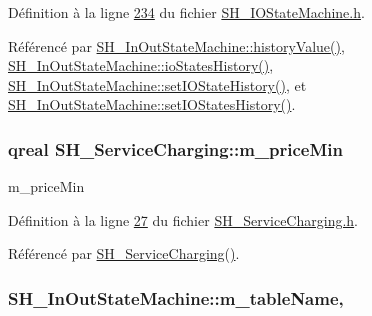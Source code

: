 Définition à la ligne \hyperlink{SH__IOStateMachine_8h_source_l00234}{234} du fichier \hyperlink{SH__IOStateMachine_8h_source}{S\-H\-\_\-\-I\-O\-State\-Machine.\-h}.



Référencé par \hyperlink{classSH__InOutStateMachine_af71bfdb3b59b7bf2763588b513b4205f}{S\-H\-\_\-\-In\-Out\-State\-Machine\-::history\-Value()}, \hyperlink{classSH__InOutStateMachine_a13889998c6dcd17db984dd6ed1454e80}{S\-H\-\_\-\-In\-Out\-State\-Machine\-::io\-States\-History()}, \hyperlink{classSH__InOutStateMachine_acbcce2c4300af1634d928b30e5e9be1c}{S\-H\-\_\-\-In\-Out\-State\-Machine\-::set\-I\-O\-State\-History()}, et \hyperlink{classSH__InOutStateMachine_af51f92c37d00a4eec4da42113cfd7d73}{S\-H\-\_\-\-In\-Out\-State\-Machine\-::set\-I\-O\-States\-History()}.

\hypertarget{classSH__ServiceCharging_a44584a7ff1edd6ae03c4f77544136c13}{
\subsubsection[{m\-\_\-price\-Min}]{\setlength{\rightskip}{0pt plus 5cm}qreal S\-H\-\_\-\-Service\-Charging\-::m\-\_\-price\-Min\hspace{0.3cm}{\ttfamily [private]}}}\label{classSH__ServiceCharging_a44584a7ff1edd6ae03c4f77544136c13}


m\-\_\-price\-Min 



Définition à la ligne \hyperlink{SH__ServiceCharging_8h_source_l00027}{27} du fichier \hyperlink{SH__ServiceCharging_8h_source}{S\-H\-\_\-\-Service\-Charging.\-h}.



Référencé par \hyperlink{classSH__ServiceCharging_afa5273d046049b1c2b020a6a19a8290b}{S\-H\-\_\-\-Service\-Charging()}.

\hypertarget{classSH__InOutStateMachine_aa009eecc5ab6181358faafb5996b6006}{
\subsubsection[{m\-\_\-table\-Name}]{\setlength{\rightskip}{0pt plus 5cm}S\-H\-\_\-\-In\-Out\-State\-Machine\-::m\-\_\-table\-Name\hspace{0.3cm}{\ttfamily [protected]}, {\ttfamily [inherited]}}}\label{classSH__InOutStateMachine_aa009eecc5ab6181358faafb5996b6006}


